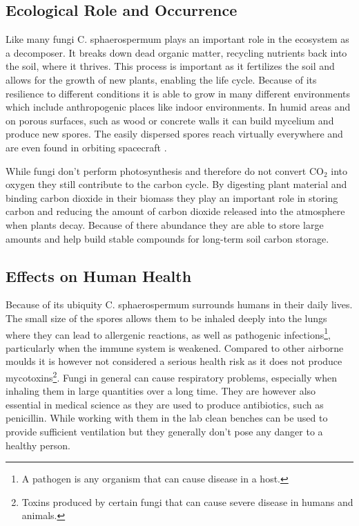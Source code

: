 \subsection{Ecological Role and Occurrence}
Like many fungi C. sphaerospermum plays an important role in the ecosystem as a decomposer. It breaks down dead organic matter, recycling nutrients back into the soil, where it thrives. This process is important as it fertilizes the soil and allows for the growth of new plants, enabling the life cycle. Because of its resilience to different conditions it is able to grow in many different environments which include anthropogenic places like indoor environments. In humid areas and on porous surfaces, such as wood or concrete walls it can build mycelium and produce new spores. The easily dispersed spores reach virtually everywhere and are even found in orbiting spacecraft \cite{radiation}.

While fungi don't perform photosynthesis and therefore do not convert CO$_2$ into oxygen they still contribute to the carbon cycle. By digesting plant material and binding carbon dioxide in their biomass they play an important role in storing carbon and reducing the amount of carbon dioxide released into the atmosphere when plants decay. Because of there abundance they are able to store large amounts and help build stable compounds for long-term soil carbon storage.


\subsection{Effects on Human Health}
Because of its ubiquity C. sphaerospermum surrounds humans in their daily lives. The small size of the spores allows them to be inhaled deeply into the lungs where they can lead to allergenic reactions, as well as pathogenic infections\footnote{A pathogen is any organism that can cause disease in a host.}, particularly when the immune system is weakened. Compared to other airborne moulds it is however not considered a serious health risk as it does not produce mycotoxins\footnote{Toxins produced by certain fungi that can cause severe disease in humans and animals.}. Fungi in general can cause respiratory problems, especially when inhaling them in large quantities over a long time. They are however also essential in medical science as they are used to produce antibiotics, such as penicillin. While working with them in the lab clean benches can be used to provide sufficient ventilation but they generally don't pose any danger to a healthy person.

